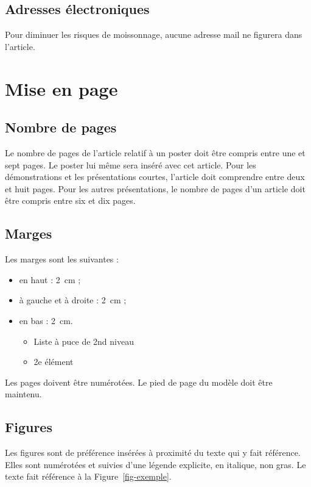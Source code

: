 \documentclass{jres}
\begin{document}
\subsection{Adresses électroniques}

Pour diminuer les risques de moissonnage, aucune adresse mail ne
figurera dans l'article.

\section{Mise en page}

\subsection{Nombre de pages}

Le nombre de pages de l'article relatif à un poster doit être compris
entre une et sept pages. Le poster lui même sera inséré avec cet
article. Pour les démonstrations et les présentations courtes,
l'article doit comprendre entre deux et huit pages. Pour les autres
présentations, le nombre de pages d'un article doit être compris entre
six et dix pages.

\subsection{Marges}

Les marges sont les suivantes :

\begin{itemize}
\item en haut : 2\ cm ;
\item à gauche et à droite : 2\ cm ;
\item en bas : 2\ cm.
\begin{itemize}
\item Liste à puce de 2nd niveau
\item 2e élément
\end{itemize}
\end{itemize}

Les pages doivent être numérotées. Le pied de page du modèle doit être
maintenu.

\subsection{Figures}

Les figures sont de préférence insérées à proximité du texte qui y
fait référence. Elles sont numérotées et suivies d'une légende
explicite, en italique, non gras. Le texte fait référence à la
Figure~\ref{fig-exemple}.
\end{document}
